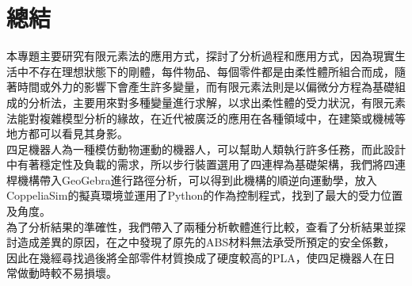 \chapter{總結}
本專題主要研究有限元素法的應用方式，探討了分析過程和應用方式，因為現實生活中不存在理想狀態下的剛體，每件物品、每個零件都是由柔性體所組合而成，隨著時間或外力的影響下會產生許多變量，而有限元素法則是以偏微分方程為基礎組成的分析法，主要用來對多種變量進行求解，以求出柔性體的受力狀況，有限元素法能對複雜模型分析的緣故，在近代被廣泛的應用在各種領域中，在建築或機械等地方都可以看見其身影。\\

四足機器人為一種模仿動物運動的機器人，可以幫助人類執行許多任務，而此設計中有著穩定性及負載的需求，所以步行裝置選用了四連桿為基礎架構，我們將四連桿機構帶入GeoGebra進行路徑分析，可以得到此機構的順逆向運動學，放入CoppeliaSim的擬真環境並運用了Python的作為控制程式，找到了最大的受力位置及角度。\\

為了分析結果的準確性，我們帶入了兩種分析軟體進行比較，查看了分析結果並探討造成差異的原因，在之中發現了原先的ABS材料無法承受所預定的安全係數，因此在幾經尋找過後將全部零件材質換成了硬度較高的PLA，使四足機器人在日常做動時較不易損壞。\



\newpage
